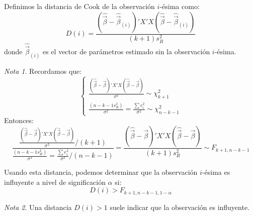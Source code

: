 \documentclass{report}
\theoremstyle{remark}
\theoremstyle{remark}
\newtheorem*{note}{Nota}
\theoremstyle{remark}
\theoremstyle{definition}
\theoremstyle{definition}
\theoremstyle{definition}
\begin{document}
Definimos la distancia de Cook de la observación $i$-ésima como:
$$D(i) = \frac{(\hat{\vec{\beta}}-\hat{\vec{\beta}}_{(i)})'X'X(\hat{\vec{\beta}}-\hat{\vec{\beta}}_{(i)})}{(k+1)s_R^2}$$
donde $\hat{\vec{\beta}}_{(i)}$ es el vector de parámetros estimado sin la observación $i$-ésima.

\begin{note}
    Recordamos que:
    $$\begin{cases}
            \frac{(\hat{\vec{\beta}}-\vec{\beta})'X'X(\hat{\vec{\beta}}-\vec{\beta})}{\sigma^2} \sim \chi^2_{k+1} \\
            \frac{(n-k-1s_R^2)}{\sigma^2} = \frac{\sum e_i^2}{\sigma^2} \sim \chi^2_{n-k-1}
        \end{cases}$$
    Entonces:
    $$\frac{\frac{(\hat{\vec{\beta}}-\vec{\beta})'X'X(\hat{\vec{\beta}}-\vec{\beta})}{\sigma^2} / (k+1)}{\frac{(n-k-1s_R^2)}{\sigma^2} = \frac{\sum e_i^2}{\sigma^2} / (n-k-1)} = \frac{(\hat{\vec{\beta}}-\vec{\beta})'X'X(\hat{\vec{\beta}}-\vec{\beta})}{(k+1)s_R^2} \sim F_{k+1, n-k-1}$$
\end{note}

Usando esta distancia, podemos determinar que la observación $i$-ésima es influyente a nivel de significación $\alpha$ si:
$$D(i) > F_{k+1, n-k-1, 1-\alpha}$$

\begin{note}
    Una distancia $D(i) > 1$ suele indicar que la observación es influyente.
\end{note}
\end{document}
